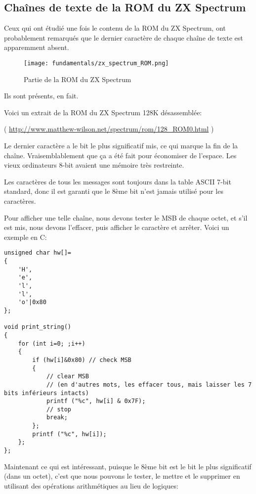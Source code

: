 \label{AND_OR_as_SUB_ADD}

\subsection{Chaînes de texte de la ROM du ZX Spectrum}

Ceux qui ont étudié une fois le contenu de la \ac{ROM} du ZX Spectrum, ont probablement
remarqués que le dernier caractère de chaque chaîne de texte est apparemment absent.

\begin{figure}[H]
\centering
\texttt{[image: fundamentals/zx\_spectrum\_ROM.png]}
\caption{Partie de la ROM du ZX Spectrum}
\end{figure}

Ils sont présents, en fait.

Voici un extrait de la ROM du ZX Spectrum 128K désassemblée:


( \url{http://www.matthew-wilson.net/spectrum/rom/128_ROM0.html} )

Le dernier caractère a le bit le plus significatif mis, ce qui marque la fin de la
chaîne.
Vraisemblablement que ça a été fait pour économiser de l'espace.
Les vieux ordinateurs 8-bit avaient une mémoire très restreinte.

Les caractères de tous les messages sont toujours dans la table \ac{ASCII} 7-bit
standard, donc il est garanti que le 8ème bit n'est jamais utilisé pour les caractères.

Pour afficher une telle chaîne, nous devons tester le \ac{MSB} de chaque octet, et
s'il est mis, nous devons l'effacer, puis afficher le caractère et arrêter.
Voici un exemple en C:

\begin{lstlisting}[style=customc]
unsigned char hw[]=
{
	'H',
	'e',
	'l',
	'l',
	'o'|0x80
};

void print_string()
{
	for (int i=0; ;i++)
	{
		if (hw[i]&0x80) // check MSB
		{
			// clear MSB
			// (en d'autres mots, les effacer tous, mais laisser les 7 bits inférieurs intacts)
			printf ("%c", hw[i] & 0x7F);
			// stop
			break;
		};
		printf ("%c", hw[i]);
	};
};
\end{lstlisting}

Maintenant ce qui est intéressant, puisque le 8ème bit est le bit le plus significatif
(dans un octet), c'est que nous pouvons le tester, le mettre et le supprimer en utilisant
des opérations arithmétiques au lieu de logiques:

